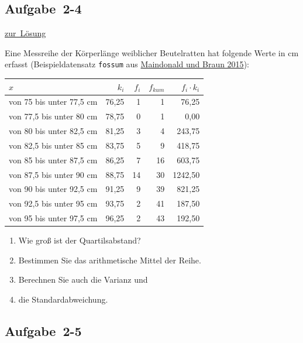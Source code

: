 \documentclass[
  11pt,
  ngerman,
  a4paper,
]{report}
\providecommand{\tightlist}{%
  \setlength{\itemsep}{0pt}\setlength{\parskip}{0pt}}
\begin{document}
\hypertarget{aufgabe-2-4}{%
\subsection{Aufgabe~2-4}\label{aufgabe-2-4}}

\protect\hyperlink{loesung-2-4}{zur~Lösung}

Eine Messreihe der Körperlänge weiblicher Beutelratten hat folgende Werte in cm erfasst (Beispieldatensatz \texttt{fossum} aus \protect\hyperlink{ref-daag}{Maindonald und Braun 2015}):

\begin{table}[H]
\centering
\begin{tabular}{lrrrr}
\toprule
$x$ & $k_i$ & $f_i$ & $f_{kum}$ & $f_i \cdot k_i$\\
\midrule
von 75 bis unter 77,5 cm & 76,25 & 1 & 1 & 76,25\\
von 77,5 bis unter 80 cm & 78,75 & 0 & 1 & 0,00\\
von 80 bis unter 82,5 cm & 81,25 & 3 & 4 & 243,75\\
von 82,5 bis unter 85 cm & 83,75 & 5 & 9 & 418,75\\
von 85 bis unter 87,5 cm & 86,25 & 7 & 16 & 603,75\\
von 87,5 bis unter 90 cm & 88,75 & 14 & 30 & 1242,50\\
von 90 bis unter 92,5 cm & 91,25 & 9 & 39 & 821,25\\
von 92,5 bis unter 95 cm & 93,75 & 2 & 41 & 187,50\\
von 95 bis unter 97,5 cm & 96,25 & 2 & 43 & 192,50\\
\bottomrule
\end{tabular}
\end{table}

\begin{enumerate}
\def\labelenumi{\alph{enumi})}
\tightlist
\item
  Wie groß ist der Quartilsabstand?
\item
  Bestimmen Sie das arithmetische Mittel der Reihe.
\item
  Berechnen Sie auch die Varianz und
\item
  die Standardabweichung.
\end{enumerate}

\hypertarget{aufgabe-2-5}{%
\subsection{Aufgabe~2-5}\label{aufgabe-2-5}}
\end{document}
